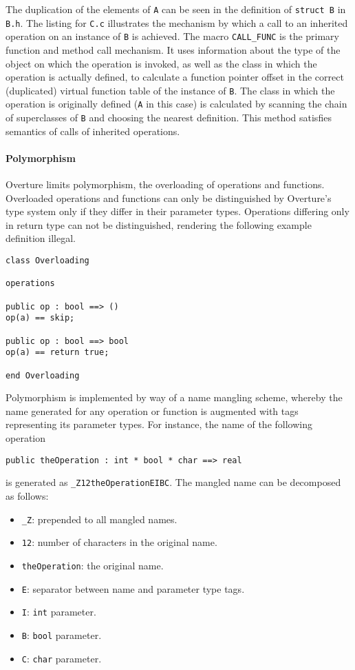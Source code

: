 %
%
%
The duplication of the elements of \texttt{A} can be seen in the definition of \texttt{struct B} in \texttt{B.h}.
%
The listing for \texttt{C.c} illustrates the mechanism by which a call to an inherited operation on an instance of \texttt{B} is achieved.
%
The macro \texttt{CALL\_FUNC} is the primary function and method call mechanism.
%
It uses information about the type of the object on which the operation is invoked, as well as the class in which the operation is actually defined, to calculate a function pointer offset in the correct (duplicated) virtual function table of the instance of \texttt{B}.
%
The class in which the operation is originally defined (\texttt{A} in this case) is calculated by scanning the chain of superclasses of \texttt{B} and choosing the nearest definition.
%
This method satisfies semantics of calls of inherited operations.
%
\paragraph{Polymorphism}
Overture limits polymorphism, the overloading of operations and functions.
%
Overloaded operations and functions can only be distinguished by Overture's type system only if they differ in their parameter types.
%
Operations differing only in return type can not be distinguished, rendering the following example definition illegal.
%
%
%
\begin{lstlisting}[language=VDM++,frame=tlbr]
class Overloading

operations

public op : bool ==> ()
op(a) == skip;

public op : bool ==> bool
op(a) == return true;

end Overloading
\end{lstlisting}
%
%
%
Polymorphism is implemented by way of a name mangling scheme, whereby the name generated for any operation or function is augmented with tags representing its parameter types.
%
For instance, the name of the following operation
%
%
%
\begin{lstlisting}[language=VDM++,frame=tlbr]
public theOperation : int * bool * char ==> real
\end{lstlisting}
%
%
%
is generated as \texttt{\_Z12theOperationEIBC}.
%
The mangled name can be decomposed as follows:
%
%
%
\begin{itemize}
\item  \texttt{\_Z}:  prepended to all mangled names.
\item  \texttt{12}:  number of characters in the original name.
\item  \texttt{theOperation}:  the original name.
\item  \texttt{E}:  separator between name and parameter type tags.
\item  \texttt{I}:  \texttt{int} parameter.
\item  \texttt{B}:  \texttt{bool} parameter.
\item  \texttt{C}:  \texttt{char} parameter.
\end{itemize}

